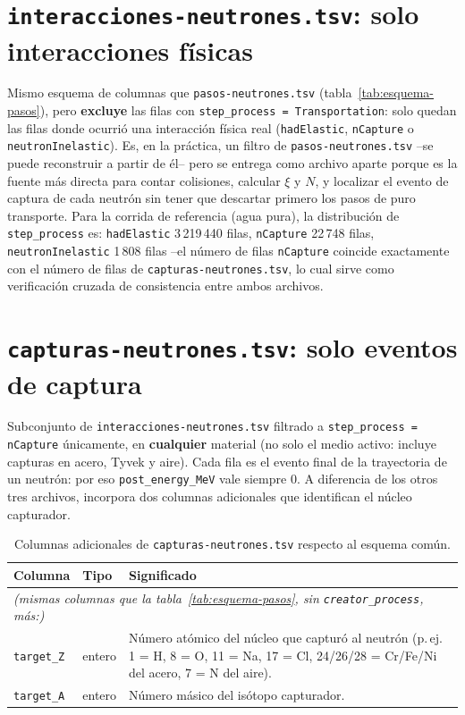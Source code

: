 \documentclass[11pt,a4paper]{article}
\newcommand{\archivo}[1]{\texttt{#1}} %
\newcommand{\var}[1]{\texttt{#1}}
\begin{document}
\section{\archivo{interacciones-neutrones.tsv}: solo interacciones físicas}

Mismo esquema de columnas que \archivo{pasos-neutrones.tsv} (tabla~\ref{tab:esquema-pasos}), pero
\textbf{excluye} las filas con \var{step\_process = Transportation}: solo quedan las filas donde
ocurrió una interacción física real (\var{hadElastic}, \var{nCapture} o \var{neutronInelastic}).
Es, en la práctica, un filtro de \archivo{pasos-neutrones.tsv} --se puede reconstruir a partir de
él-- pero se entrega como archivo aparte porque es la fuente más directa para contar colisiones,
calcular $\xi$ y $N$, y localizar el evento de captura de cada neutrón sin tener que descartar
primero los pasos de puro transporte. Para la corrida de referencia (agua pura), la distribución de
\var{step\_process} es: \var{hadElastic} 3\,219\,440 filas, \var{nCapture} 22\,748 filas,
\var{neutronInelastic} 1\,808 filas --el número de filas \var{nCapture} coincide exactamente con el
número de filas de \archivo{capturas-neutrones.tsv}, lo cual sirve como verificación cruzada de
consistencia entre ambos archivos.

\section{\archivo{capturas-neutrones.tsv}: solo eventos de captura}

Subconjunto de \archivo{interacciones-neutrones.tsv} filtrado a \var{step\_process = nCapture}
únicamente, en \textbf{cualquier} material (no solo el medio activo: incluye capturas en acero,
Tyvek y aire). Cada fila es el evento final de la trayectoria de un neutrón: por eso
\var{post\_energy\_MeV} vale siempre 0. A diferencia de los otros tres archivos, incorpora dos
columnas adicionales que identifican el núcleo capturador.

\begin{table}[H]
\centering
\small
\begin{tabularx}{\linewidth}{l l X}
\toprule
\textbf{Columna} & \textbf{Tipo} & \textbf{Significado} \\
\midrule
\multicolumn{3}{l}{\textit{(mismas columnas que la tabla~\ref{tab:esquema-pasos}, sin \var{creator\_process}, más:)}} \\
\var{target\_Z} & entero & Número atómico del núcleo que capturó al neutrón (p.\,ej. 1 = H, 8 = O,
11 = Na, 17 = Cl, 24/26/28 = Cr/Fe/Ni del acero, 7 = N del aire). \\
\var{target\_A} & entero & Número másico del isótopo capturador. \\
\bottomrule
\end{tabularx}
\caption{Columnas adicionales de \archivo{capturas-neutrones.tsv} respecto al esquema común.}
\end{table}
\end{document}
